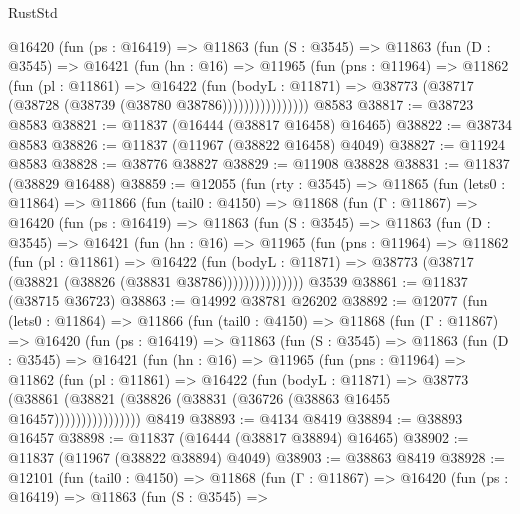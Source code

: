 \begin{lexlean}{RustStd}
\begin{coremodule}
            @16420
              (fun (ps : @16419) =>
              @11863
                (fun (S : @3545) =>
                @11863
                  (fun (D : @3545) =>
                  @16421
                    (fun (hn : @16) =>
                    @11965
                      (fun (pns : @11964) =>
                      @11862
                        (fun (pl : @11861) =>
                        @16422
                          (fun (bodyL : @11871) =>
                          @38773 (@38717 (@38728 (@38739 (@38780 @38786))))))))))))))))
    @8583
@38817 := @38723 @8583
@38821 := @11837 (@16444 (@38817 @16458) @16465)
@38822 := @38734 @8583
@38826 := @11837 (@11967 (@38822 @16458) @4049)
@38827 := @11924 @8583
@38828 := @38776 @38827
@38829 := @11908 @38828
@38831 := @11837 (@38829 @16488)
@38859 := @12055
    (fun (rty : @3545) =>
    @11865
      (fun (lets0 : @11864) =>
      @11866
        (fun (tail0 : @4150) =>
        @11868
          (fun (Γ : @11867) =>
          @16420
            (fun (ps : @16419) =>
            @11863
              (fun (S : @3545) =>
              @11863
                (fun (D : @3545) =>
                @16421
                  (fun (hn : @16) =>
                  @11965
                    (fun (pns : @11964) =>
                    @11862
                      (fun (pl : @11861) =>
                      @16422
                        (fun (bodyL : @11871) =>
                        @38773 (@38717 (@38821 (@38826 (@38831 @38786)))))))))))))))
    @3539
@38861 := @11837 (@38715 @36723)
@38863 := @14992 @38781 @26202
@38892 := @12077
    (fun (lets0 : @11864) =>
    @11866
      (fun (tail0 : @4150) =>
      @11868
        (fun (Γ : @11867) =>
        @16420
          (fun (ps : @16419) =>
          @11863
            (fun (S : @3545) =>
            @11863
              (fun (D : @3545) =>
              @16421
                (fun (hn : @16) =>
                @11965
                  (fun (pns : @11964) =>
                  @11862
                    (fun (pl : @11861) =>
                    @16422
                      (fun (bodyL : @11871) =>
                      @38773
                        (@38861
                          (@38821 (@38826 (@38831 (@36726 (@38863 @16455 @16457))))))))))))))))
    @8419
@38893 := @4134 @8419
@38894 := @38893 @16457
@38898 := @11837 (@16444 (@38817 @38894) @16465)
@38902 := @11837 (@11967 (@38822 @38894) @4049)
@38903 := @38863 @8419
@38928 := @12101
    (fun (tail0 : @4150) =>
    @11868
      (fun (Γ : @11867) =>
      @16420
        (fun (ps : @16419) =>
        @11863
          (fun (S : @3545) =>

\end{coremodule}
\end{lexlean}
